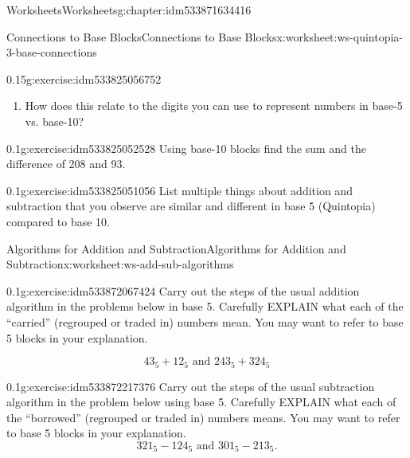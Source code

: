 \documentclass[twoside,11pt,]{book}
\begin{document}
\begin{chapterptx}{Worksheets}{}{Worksheets}{}{}{g:chapter:idm533871634416}
\begin{worksheet-section-numberless}{Connections to Base Blocks}{}{Connections to Base Blocks}{}{}{x:worksheet:ws-quintopia-3-base-connections}
\begin{divisionexercise}{3}{}{0.15}{g:exercise:idm533825056752}
\begin{enumerate}[label=(\alph*)]
\item{}How does this relate to the digits you can use to represent numbers in base-5 vs. base-10?%
\end{enumerate}
\end{divisionexercise}%
\begin{divisionexercise}{4}{}{0.1}{g:exercise:idm533825052528}%
Using base-10 blocks find the sum and the difference of 208 and 93.%
\end{divisionexercise}%
\begin{divisionexercise}{5}{}{0.1}{g:exercise:idm533825051056}%
List multiple things about addition and subtraction that you observe are similar and different in base 5 (Quintopia) compared to base 10.%
\end{divisionexercise}%
\end{worksheet-section-numberless}
\restoregeometry
%
%
\typeout{************************************************}
\typeout{************************************************}
%
\begin{worksheet-section-numberless}{Algorithms for Addition and Subtraction}{}{Algorithms for Addition and Subtraction}{}{}{x:worksheet:ws-add-sub-algorithms}
\begin{divisionexercise}{1}{}{0.1}{g:exercise:idm533872067424}%
Carry out the steps of the usual addition algorithm in the problems below in base 5.  Carefully EXPLAIN what each of the ``carried'' (regrouped or traded in) numbers mean.  You may want to refer to base 5 blocks in your explanation.%
\par
%
\begin{equation*}
43_{5}+12_{5} \text{ and } 243_{5}+324_{5}
\end{equation*}
%
\end{divisionexercise}%
\clearpage
\begin{divisionexercise}{2}{}{0.1}{g:exercise:idm533872217376}%
Carry out the steps of the usual subtraction algorithm in the problem below using base 5.  Carefully EXPLAIN what each of the ``borrowed'' (regrouped or traded in) numbers means.  You may want to refer to base 5 blocks in your explanation.%
\begin{equation*}
321_{5}-124_5 \text{ and } 301_5-213_5 \text{.}
\end{equation*}
%
\end{divisionexercise}%
\end{worksheet-section-numberless}

\end{chapterptx}
\end{document}
